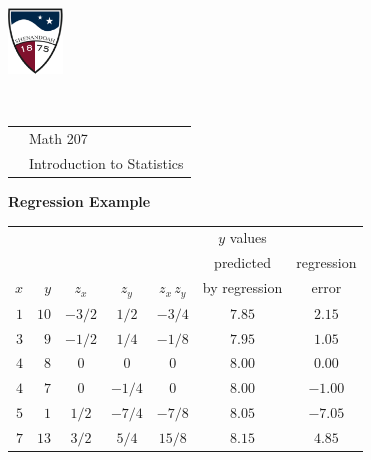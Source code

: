 \documentclass[10pt]{article}
\begin{document}
\pagestyle{empty}
\lstset{language=R, showspaces=false, showstringspaces=false}

\href{http://www.su.edu}{\includegraphics[height=1.75cm]{sulogo.eps}}
\vspace{-1.69cm}

{\small{\ }\hfill
\begin{tabular}{cl}
& Math 207\\
& Introduction to Statistics\\
\end{tabular}
}
\setlength{\baselineskip}{1.05\baselineskip}

\begin{center}
\textbf{\large  Regression Example}
\end{center}
\newcommand{\Z}{\hphantom{0}}
\newcommand{\VP}{\vphantom{\Large Y}}
\newcommand{\M}{\hphantom{$-$}}

\begin{center}
\begin{tabular}{|rr|ccc||cc|}\hline
    &     &       &       &           & $y$ values    &             \VP\\
    &     &       &       &           & predicted     & regression     \\
$x$ & $y$ & $z_x$ & $z_y$ & $z_x\,z_y$& by regression & error           \\\hline
$1$   & $10$   & $-3/2$\M  & $1/2$  & $-3/4$\M    & $7.85$ & $2.15$ \VP\\
$3$   & $9$   & $-1/2$\M  & $1/4$   & $-1/8$\M    & $7.95$ & $1.05$    \\
$4$   & $8$   & $0$     & $0$       & $0$         & $8.00$ & $0.00$    \\
$4$   & $7$   & $0$     & $-1/4$\M  & $0$         & $8.00$ & $-1.00$\M \\
$5$   & $1$   & $1/2$   & $-7/4$\M  & $-7/8$\M    & $8.05$ & $-7.05$\M \\
$7$   & $13$  & $3/2$   & $5/4$   & $15/8$\Z      & $8.15$ & $4.85$    \\\hline
\end{tabular}
\end{center}
\end{document}
